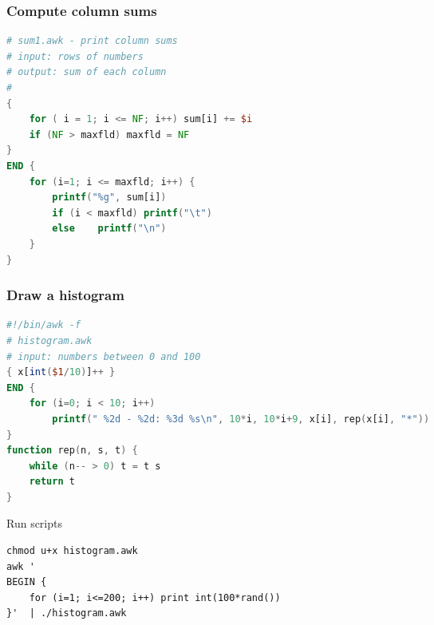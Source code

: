 \documentclass[red]{beamer}
\begin{document}
\begin{CJK*}{UTF8}{gbsn}
\begin{frame}
\frametitle{Compute column sums}
\begin{lstlisting}[language=awk,format=awk]
# sum1.awk - print column sums
# input: rows of numbers
# output: sum of each column
#
{
	for ( i = 1; i <= NF; i++) sum[i] += $i
	if (NF > maxfld) maxfld = NF
}
END {
	for (i=1; i <= maxfld; i++) {
		printf("%g", sum[i])
		if (i < maxfld) printf("\t")
		else 	printf("\n")
	}
}
\end{lstlisting}
\end{frame}


\begin{frame}
\frametitle{Draw a histogram}
\begin{lstlisting}[language=awk,format=awk,basicstyle=\tiny\ttfamily]
#!/bin/awk -f
# histogram.awk
# input: numbers between 0 and 100
{ x[int($1/10)]++ }
END {
	for (i=0; i < 10; i++)
		printf(" %2d - %2d: %3d %s\n", 10*i, 10*i+9, x[i], rep(x[i], "*"))
}
function rep(n, s, t) {
	while (n-- > 0) t = t s
	return t
}
\end{lstlisting}
\begin{block}{\centering\scriptsize Run scripts}
\begin{lstlisting}[basicstyle=\tiny\ttfamily]
chmod u+x histogram.awk
awk '
BEGIN {
	for (i=1; i<=200; i++) print int(100*rand())
}'  | ./histogram.awk
\end{lstlisting}
\end{block}
\end{frame}



\end{CJK*}
\end{document}
